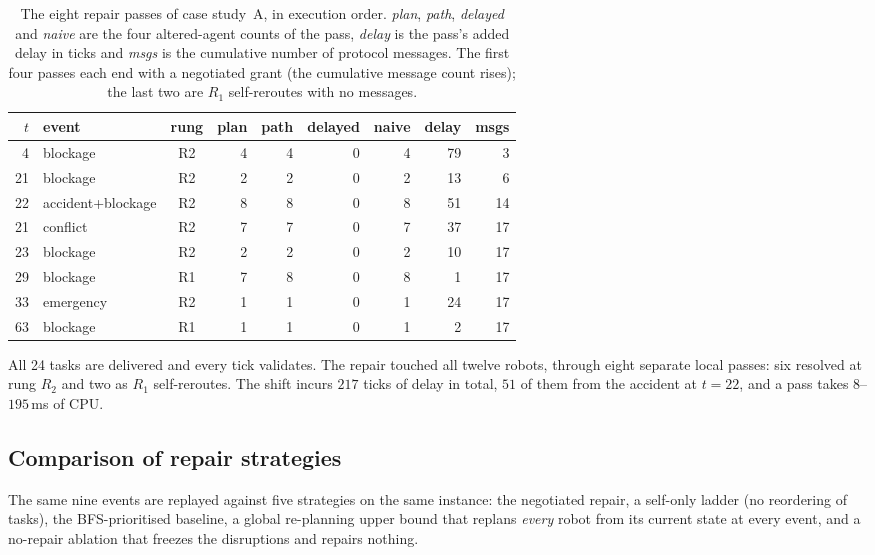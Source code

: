 \documentclass[10pt,a4paper]{article}
\begin{document}
\begin{table}[H]
\centering
\small
\setlength{\tabcolsep}{5pt}
\begin{tabular}{@{}r l c r r r r r r@{}}
\toprule
$t$ & \textbf{event} & \textbf{rung} & \textbf{plan} & \textbf{path} &
\textbf{delayed} & \textbf{naive} & \textbf{delay} & \textbf{msgs}\\
\midrule
4  & blockage           & R2 & 4 & 4 & 0 & 4 & 79 & 3\\
21 & blockage           & R2 & 2 & 2 & 0 & 2 & 13 & 6\\
22 & accident+blockage  & R2 & 8 & 8 & 0 & 8 & 51 & 14\\
21 & conflict           & R2 & 7 & 7 & 0 & 7 & 37 & 17\\
23 & blockage           & R2 & 2 & 2 & 0 & 2 & 10 & 17\\
29 & blockage           & R1 & 7 & 8 & 0 & 8 & 1  & 17\\
33 & emergency          & R2 & 1 & 1 & 0 & 1 & 24 & 17\\
63 & blockage           & R1 & 1 & 1 & 0 & 1 & 2  & 17\\
\bottomrule
\end{tabular}
\caption{The eight repair passes of case study~A, in execution order.
\emph{plan}, \emph{path}, \emph{delayed} and \emph{naive} are the four
altered-agent counts of the pass, \emph{delay} is the pass's added delay in
ticks and \emph{msgs} is the cumulative number of protocol messages.  The
first four passes each end with a negotiated grant (the cumulative message
count rises); the last two are $R_1$ self-reroutes with no messages.}
\label{tab:passesA}
\end{table}
All 24 tasks are delivered and every tick validates.  The repair touched all
twelve robots, through eight separate local passes: six resolved at rung
$R_2$ and two as $R_1$ self-reroutes.  The shift incurs $217$ ticks of delay
in total, $51$ of them from the accident at $t=22$, and a pass takes
$8$--$195$\,ms of CPU.

\subsection{Comparison of repair strategies}

The same nine events are replayed against five strategies on the same
instance: the negotiated repair, a self-only ladder (no reordering of tasks),
the BFS-prioritised baseline, a global re-planning upper bound that replans
\emph{every} robot from its current state at every event, and a no-repair
ablation that freezes the disruptions and repairs nothing.
\end{document}
